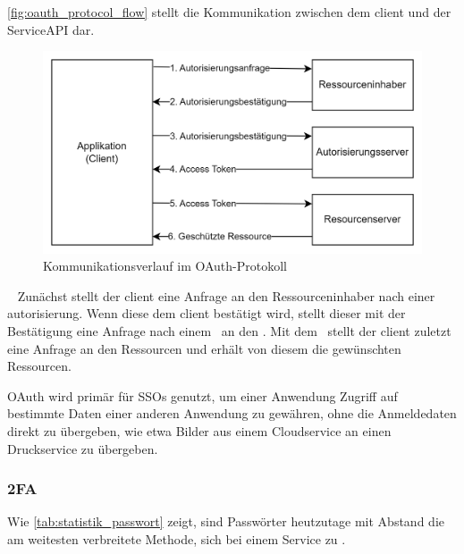 \autoref{fig:oauth_protocol_flow}\autocite[\vglf][, Abbildung 1]{rfc6749} stellt die Kommunikation zwischen dem \gls{client} und der Service\nonbreakdash\ac{API} dar.
\begin{figure}[htbp]
    \centering
    \includegraphics[width=\linewidth]{src/abbildungen/OAuth_abstract_flow}
    \caption[Kommunikationsverlauf im OAuth-Protokoll]{Kommunikationsverlauf im OAuth-Protokoll\footnotemark}
    \label{fig:oauth_protocol_flow}
\end{figure}\ 
Zunächst stellt der \gls{client} eine Anfrage an den Ressourceninhaber nach einer \gls{autorisierung}.
Wenn diese dem \gls{client} bestätigt wird, stellt dieser mit der Bestätigung eine Anfrage nach einem\  an den .
Mit dem\  stellt der \gls{client} zuletzt eine Anfrage an den Ressourcen und erhält von diesem die gewünschten Ressourcen.

OAuth wird primär für \acp{SSO} genutzt, um \zb einer Anwendung Zugriff auf bestimmte Daten einer anderen Anwendung zu gewähren, ohne die Anmeldedaten direkt zu übergeben, wie etwa Bilder aus einem Cloudservice an einen Druckservice zu übergeben.\autocite[\vglf][]{OAuthWebProtocol:2012}

\subsubsection[2-Faktor-Authentifizierung]{\acf{2FA}}\label{subsubsec:2fa}
Wie \autoref{tab:statistik_passwort}\autocite{statista-authentifizierung} zeigt, sind Passwörter heutzutage mit Abstand die am weitesten verbreitete Methode, sich bei einem Service zu .

